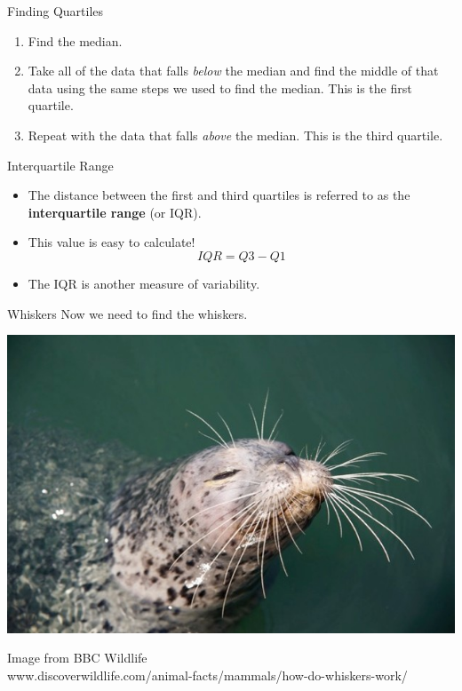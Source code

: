 \begin{frame}{Finding Quartiles}
    \begin{enumerate}
        \item Find the median.
        \item Take all of the data that falls \textit{below} the median and find the middle of that data using the same steps we used to find the median. This is the first quartile.
        \item Repeat with the data that falls \textit{above} the median. This is the third quartile.
    \end{enumerate}
\end{frame}

\begin{frame}{Interquartile Range}
    \begin{itemize}
        \item The distance between the first and third quartiles is referred to as the \textbf{interquartile range} (or IQR).
        \item This value is easy to calculate!
        \[
        IQR = Q3 - Q1
        \]
        \item The IQR is another measure of variability.
    \end{itemize}
\end{frame}

\begin{frame}{Whiskers}
    Now we need to find the whiskers.
    \begin{center}
        \includegraphics[scale=0.4]{images/whiskers.jpg}
    \end{center}
    \flushright\tiny{Image from BBC Wildlife \\ www.discoverwildlife.com/animal-facts/mammals/how-do-whiskers-work/}
\end{frame}

